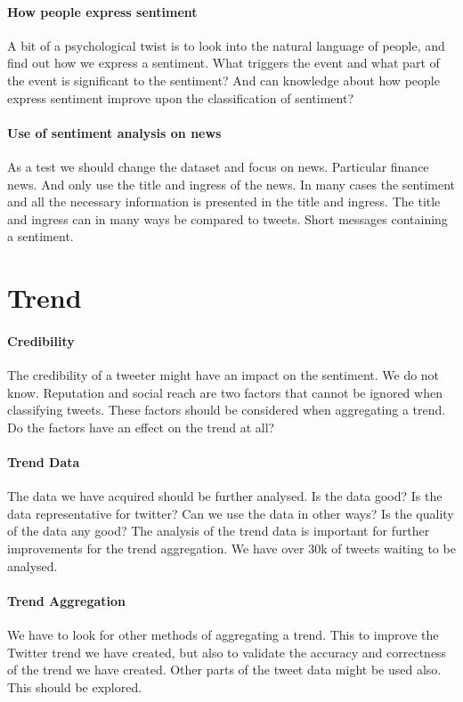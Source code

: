 \paragraph{How people express sentiment}
A bit of a psychological twist is to look into the natural language of people,
and find out how we express a sentiment. What triggers the event and what part
of the event is significant to the sentiment? And can knowledge about how
people express sentiment improve upon the classification of sentiment? 

\paragraph{Use of sentiment analysis on news}
As a test we should change the dataset and focus on news. Particular finance
news. And only use the title and ingress of the news. In many cases the
sentiment and all the necessary information is presented in the title and
ingress. The title and ingress can in many ways be compared to tweets. Short
messages containing a sentiment.   
%

\section{Trend}\label{future_work:trend}
\paragraph{Credibility}
The credibility of a tweeter might have an impact on the sentiment. We do not
know. Reputation and social reach are two factors that cannot be ignored when 
classifying tweets. These factors should be considered when aggregating a
trend. Do the factors have an effect on the trend at all? 

\paragraph{Trend Data}
The data we have acquired should be further analysed. Is the data good? Is the
data representative for twitter? Can we use the data in other ways? Is the
quality of the data any good?  The analysis of the trend data is important for
further improvements for the trend aggregation. We have over 30k of tweets
waiting to be analysed. 

\paragraph{Trend Aggregation}
We have to look for other methods of aggregating a trend. This to improve the
Twitter trend we have created, but also to validate the accuracy and
correctness of the trend we have created. Other parts of the tweet data might
be used also. This should be explored.  
%
